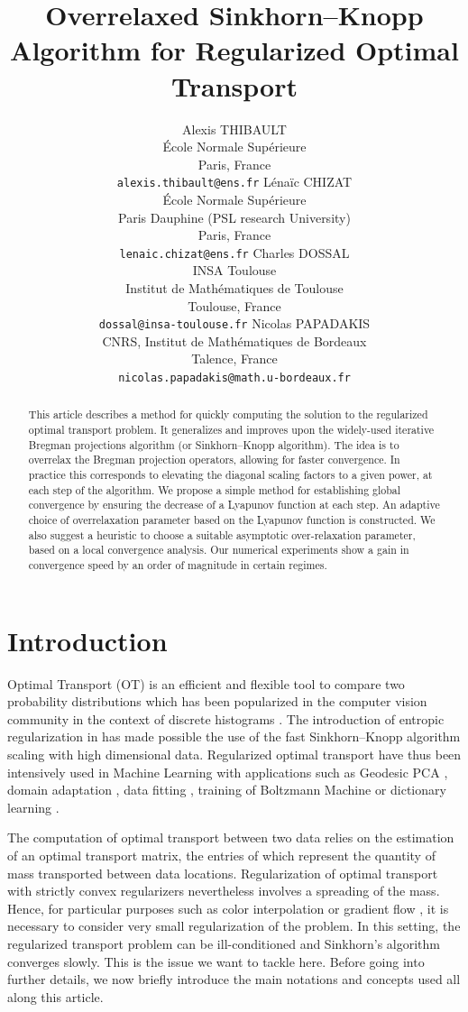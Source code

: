 \documentclass{article} %
\title{Overrelaxed Sinkhorn--Knopp Algorithm for Regularized Optimal Transport}
\author{
Alexis THIBAULT\\
\'Ecole Normale Sup\'erieure\\
Paris, France\\
\texttt{alexis.thibault@ens.fr}
 \And
L\'ena\"ic CHIZAT\\
\'Ecole Normale Sup\'erieure\\ Paris Dauphine (PSL research University)\\
Paris, France\\
\texttt{lenaic.chizat@ens.fr}
 \AND
Charles DOSSAL\\
INSA Toulouse\\
Institut de Math\'ematiques de Toulouse\\
Toulouse,  France\\
\texttt{dossal@insa-toulouse.fr}
\And 
Nicolas PAPADAKIS\\
CNRS, Institut de Math\'ematiques de Bordeaux\\
Talence, France\\
\texttt{nicolas.papadakis@math.u-bordeaux.fr}
}
\theoremstyle{plain}
\theoremstyle{definition}
\theoremstyle{remark}
\begin{document}
\maketitle

\begin{abstract}
This article describes a method for quickly computing the solution to the regularized optimal transport problem. It generalizes and improves upon the widely-used iterative Bregman projections algorithm (or Sinkhorn--Knopp algorithm). 
The idea is to overrelax the Bregman projection operators, allowing for faster convergence. In practice this corresponds to elevating the diagonal scaling factors to a given power, at each step of the algorithm.
We propose a simple method for establishing global convergence by ensuring the decrease of a Lyapunov function at each step.
An adaptive choice of overrelaxation parameter based on the Lyapunov function is constructed.
We also suggest a heuristic to choose a suitable asymptotic over-relaxation parameter, based on a local convergence analysis. Our numerical experiments show a gain in convergence speed by an order of magnitude in certain regimes.
\end{abstract}

\section{Introduction}
Optimal Transport (OT) is an efficient and flexible tool to compare two probability distributions which has been popularized in the computer vision community in the context of discrete histograms \cite{Rubner2000}. The introduction of entropic regularization in \cite{cuturi13} has made possible the use of the fast Sinkhorn--Knopp algorithm \cite{sinkhorn64}   scaling with high dimensional data. 
Regularized optimal transport have thus been intensively used  in  Machine Learning with applications such as   Geodesic PCA \cite{seguy2015principal}, domain adaptation \cite{2015arXiv150700504C}, data fitting \cite{2015arXiv150605439F},  training of Boltzmann Machine \cite{NIPS2016_6248}  or dictionary learning \cite{Rolet2016,2017arXiv170801955S}.

The computation of optimal transport between two data relies on the estimation of an optimal transport matrix, the entries of which represent the quantity of mass transported between  data locations. 
Regularization of optimal transport with strictly convex regularizers \cite{cuturi13, dessein2016}  nevertheless involves a spreading of the mass. Hence, for particular purposes such as color interpolation \cite{Rabin2014} or gradient flow \cite{2016arXiv160705816C}, it is  necessary  to consider very small regularization of the problem.
In this setting,  the regularized transport problem can be ill-conditioned and Sinkhorn's algorithm converges slowly. This is the issue  we want to tackle here.
Before going into further details, we now briefly introduce the main notations and concepts used all along this article.
\end{document}
